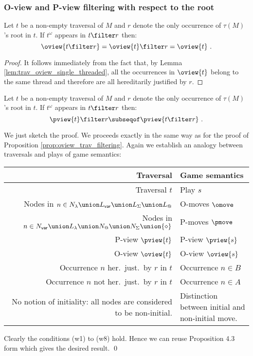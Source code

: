 \subsubsection{O-view and P-view filtering with respect to the root}
\begin{lemma}
\label{lem:trav_filtering}
Let $t$ be a non-empty traversal of $M$ and $r$ denote the only occurrence of $\tau(M)$'s
root in $t$. If $t^\omega$ appears in $t\filter r$ then:
$$\oview{t\filter r} = \oview{t}\filter r = \oview{t} \ .$$
\end{lemma}
\begin{proof}
It follows immediately from the fact that, by Lemma \ref{lem:trav_oview_single_threaded}, all the occurrences in $\oview{t}$ belong to the same thread and therefore are all hereditarily justified by $r$.
\end{proof}

\begin{lemma}
\label{lem:trav_pview_red}
Let $t$ be a non-empty traversal of $M$ and $r$ denote the only occurrence of $\tau(M)$'s
root in $t$. If $t^\omega$ appears in $t\filter r$ then:
$$ \pview{t} \filter r \subseqof \pview{t \filter r} \  .$$
\end{lemma}
\proof
We just sketch the proof. We proceeds exactly in the same way as for the proof of Proposition \ref{prop:oview_trav_filtering}.  Again we establish an analogy between traversals and plays of game semantics:
\begin{center}
\begin{tabular}{r|p{5cm}}
{Traversal} & {Game semantics} \\
\hline
Traversal $t$ & Play $s$ \\
Nodes in $n \in N_\lambda \union L_{\sf var} \union L_\Sigma \union L_@$ & O-moves $\omove$ \\
Nodes in $n \in N_{\sf var} \union L_\lambda \union N_@ \union N_\Sigma \union \{\diamond\}$ & P-moves $\pmove$\\
P-view $\pview{t}$  & P-view $\pview{s}$\\
O-view $\oview{t}$  & O-view $\oview{s}$\\
Occurrence $n$ her.\ just.\ by $r$ in $t$ & Occurrence $n \in B$ \\
Occurrence $n$ not her.\ just.\ by $r$ in $t$ & Occurrence $n \in A$ \\
\parbox[t]{6cm}{\raggedleft No notion of initiality: all nodes are considered to be non-initial.} & Distinction between initial and non-initial move.
\end{tabular}
\end{center}
Clearly the conditions (w1) to (w8) hold. Hence we can reuse Proposition 4.3 form \cite{hylandong_pcf} which gives the desired result. \qed
\bigskip


